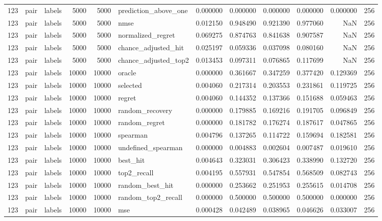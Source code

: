 \begin{tabular}{rllrrlrrrrrr}
123 & pair & labels & 5000 & 5000 & prediction_above_one & 0.000000 & 0.000000 & 0.000000 & 0.000000 & 0.000000 & 256 \\
123 & pair & labels & 5000 & 5000 & nmse & 0.012150 & 0.948490 & 0.921390 & 0.977060 & NaN & 256 \\
123 & pair & labels & 5000 & 5000 & normalized_regret & 0.069275 & 0.874763 & 0.841638 & 0.907587 & NaN & 256 \\
123 & pair & labels & 5000 & 5000 & chance_adjusted_hit & 0.025197 & 0.059336 & 0.037098 & 0.080160 & NaN & 256 \\
123 & pair & labels & 5000 & 5000 & chance_adjusted_top2 & 0.013453 & 0.097311 & 0.076865 & 0.117699 & NaN & 256 \\
123 & pair & labels & 10000 & 10000 & oracle & 0.000000 & 0.361667 & 0.347259 & 0.377420 & 0.129369 & 256 \\
123 & pair & labels & 10000 & 10000 & selected & 0.004060 & 0.217314 & 0.203553 & 0.231861 & 0.119725 & 256 \\
123 & pair & labels & 10000 & 10000 & regret & 0.004060 & 0.144352 & 0.137366 & 0.151688 & 0.059463 & 256 \\
123 & pair & labels & 10000 & 10000 & random_recovery & 0.000000 & 0.179885 & 0.169216 & 0.191705 & 0.096849 & 256 \\
123 & pair & labels & 10000 & 10000 & random_regret & 0.000000 & 0.181782 & 0.176274 & 0.187617 & 0.047865 & 256 \\
123 & pair & labels & 10000 & 10000 & spearman & 0.004796 & 0.137265 & 0.114722 & 0.159694 & 0.182581 & 256 \\
123 & pair & labels & 10000 & 10000 & undefined_spearman & 0.000000 & 0.004883 & 0.002604 & 0.007487 & 0.019610 & 256 \\
123 & pair & labels & 10000 & 10000 & best_hit & 0.004643 & 0.323031 & 0.306423 & 0.338990 & 0.132720 & 256 \\
123 & pair & labels & 10000 & 10000 & top2_recall & 0.004195 & 0.557931 & 0.547854 & 0.568509 & 0.082743 & 256 \\
123 & pair & labels & 10000 & 10000 & random_best_hit & 0.000000 & 0.253662 & 0.251953 & 0.255615 & 0.014708 & 256 \\
123 & pair & labels & 10000 & 10000 & random_top2_recall & 0.000000 & 0.500000 & 0.500000 & 0.500000 & 0.000000 & 256 \\
123 & pair & labels & 10000 & 10000 & mse & 0.000428 & 0.042489 & 0.038965 & 0.046626 & 0.033007 & 256 \\

\end{tabular}
